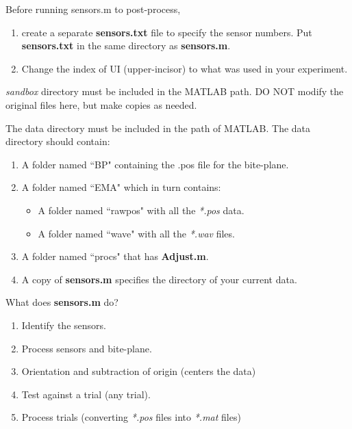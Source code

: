 \documentclass[12pt]{article}
\begin{document}
\bigskip
	
	Before running sensors.m to post-process, 
	\begin{enumerate}
	    \item create a separate \textbf{sensors.txt} file to specify the sensor numbers. Put \textbf{sensors.txt} in the same directory as \textbf{sensors.m}.
	    \item Change the index of UI (upper-incisor) to what was used in your experiment.
	\end{enumerate}

	\bigskip 	
	
	\emph{sandbox} directory must be included in the MATLAB path. DO NOT modify the original files here, but make copies as needed.
	
	\bigskip
	
	The data directory must be included in the path of MATLAB. The data directory should contain:
	\begin{enumerate}
	    \item A folder named ``BP" containing the .pos file for the bite-plane.
	    \item A folder named ``EMA" which in turn contains:
	    \begin{itemize}
	        \item A folder named ``rawpos" with all the \emph{*.pos} data.
	        \item A folder named ``wave" with all the \emph{*.wav} files.
	    \end{itemize}
	    \item A folder named ``procs" that has \textbf{Adjust.m}.
	    \item A copy of \textbf{sensors.m} specifies the directory of your current data.
	\end{enumerate}
	
	\bigskip
	
	What does \textbf{sensors.m} do?
	\begin{enumerate}
	    \item Identify the sensors.
	    \item Process sensors and bite-plane.
	    \item Orientation and subtraction of origin (centers the data)
	    \item Test against a trial (any trial).
	    \item Process trials (converting \emph{*.pos} files into \emph{*.mat} files)
	\end{enumerate}
\end{document}

